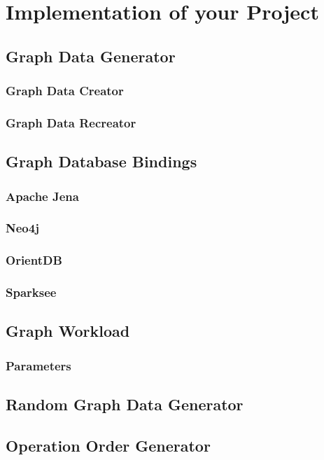 \chapter{Implementation of your Project}
\label{ch:implementation}

\section{Graph Data Generator}

\subsection{Graph Data Creator}

\subsection{Graph Data Recreator}

\section{Graph Database Bindings}
\label{ch:implementation:se:graphDatabaseBindings}
\subsection{Apache Jena}

\subsection{Neo4j}

\subsection{OrientDB}

\subsection{Sparksee}

\section{Graph Workload}

\subsection{Parameters}

\section{Random Graph Data Generator}

\section{Operation Order Generator}
